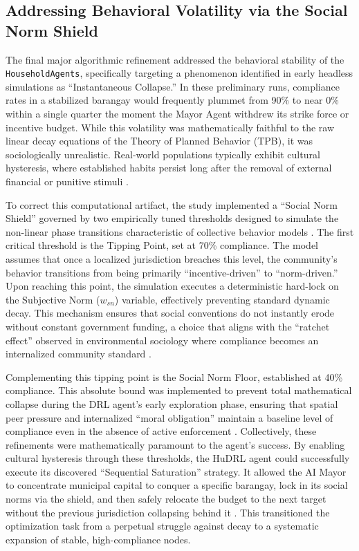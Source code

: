\subsection{Addressing Behavioral Volatility via the Social Norm Shield}
The final major algorithmic refinement addressed the behavioral stability of the \texttt{HouseholdAgents}, specifically targeting a phenomenon identified in early headless simulations as ``Instantaneous Collapse.'' In these preliminary runs, compliance rates in a stabilized barangay would frequently plummet from 90\% to near 0\% within a single quarter the moment the Mayor Agent withdrew its strike force or incentive budget. While this volatility was mathematically faithful to the raw linear decay equations of the Theory of Planned Behavior (TPB), it was sociologically unrealistic. Real-world populations typically exhibit cultural hysteresis, where established habits persist long after the removal of external financial or punitive stimuli \citep{Nishimura2022}.

To correct this computational artifact, the study implemented a ``Social Norm Shield'' governed by two empirically tuned thresholds designed to simulate the non-linear phase transitions characteristic of collective behavior models \citep{Centola2018}. The first critical threshold is the Tipping Point, set at 70\% compliance. The model assumes that once a localized jurisdiction breaches this level, the community’s behavior transitions from being primarily ``incentive-driven'' to ``norm-driven.'' Upon reaching this point, the simulation executes a deterministic hard-lock on the Subjective Norm ($w_{sn}$) variable, effectively preventing standard dynamic decay. This mechanism ensures that social conventions do not instantly erode without constant government funding, a choice that aligns with the ``ratchet effect'' observed in environmental sociology where compliance becomes an internalized community standard \citep{Nyborg2016}.

Complementing this tipping point is the Social Norm Floor, established at 40\% compliance. This absolute bound was implemented to prevent total mathematical collapse during the DRL agent's early exploration phase, ensuring that spatial peer pressure and internalized ``moral obligation'' maintain a baseline level of compliance even in the absence of active enforcement \citep{Zheng2022}. Collectively, these refinements were mathematically paramount to the agent's success. By enabling cultural hysteresis through these thresholds, the HuDRL agent could successfully execute its discovered ``Sequential Saturation'' strategy. It allowed the AI Mayor to concentrate municipal capital to conquer a specific barangay, lock in its social norms via the shield, and then safely relocate the budget to the next target without the previous jurisdiction collapsing behind it \citep{Abdallah2021}. This transitioned the optimization task from a perpetual struggle against decay to a systematic expansion of stable, high-compliance nodes.